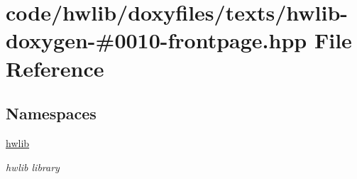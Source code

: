 \hypertarget{hwlib-doxygen-#0010-frontpage_8hpp}{}\section{code/hwlib/doxyfiles/texts/hwlib-\/doxygen-\/\#0010-\/frontpage.hpp File Reference}
\label{hwlib-doxygen-#0010-frontpage_8hpp}
\subsection*{Namespaces}
\begin{DoxyCompactItemize}
\item 
 \hyperlink{namespacehwlib}{hwlib}
\begin{DoxyCompactList}\small\item\em hwlib library \end{DoxyCompactList}\end{DoxyCompactItemize}
